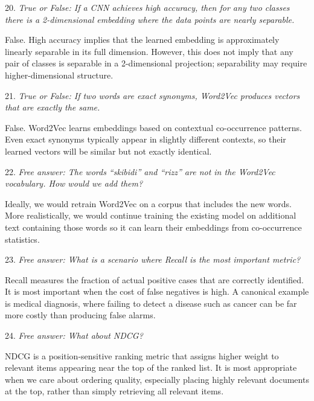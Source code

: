 \vspace{1cm}

20. \textit{True or False: If a CNN achieves high accuracy, then for any two classes there is a 2-dimensional embedding where the data points are nearly separable.}

False. High accuracy implies that the learned embedding is approximately linearly separable in its full dimension. However, this does not imply that any pair of classes is separable in a 2-dimensional projection; separability may require higher-dimensional structure.

\vspace{1cm}

21. \textit{True or False: If two words are exact synonyms, Word2Vec produces vectors that are exactly the same.}

False. Word2Vec learns embeddings based on contextual co-occurrence patterns. Even exact synonyms typically appear in slightly different contexts, so their learned vectors will be similar but not exactly identical.

\vspace{1cm}

22. \textit{Free answer: The words ``skibidi'' and ``rizz'' are not in the Word2Vec vocabulary. How would we add them?}

Ideally, we would retrain Word2Vec on a corpus that includes the new words. More realistically, we would continue training the existing model on additional text containing those words so it can learn their embeddings from co-occurrence statistics.

\vspace{1cm}

23. \textit{Free answer: What is a scenario where Recall is the most important metric?}

Recall measures the fraction of actual positive cases that are correctly identified. It is most important when the cost of false negatives is high. A canonical example is medical diagnosis, where failing to detect a disease such as cancer can be far more costly than producing false alarms.

\vspace{1cm}

24. \textit{Free answer: What about NDCG?}

NDCG is a position-sensitive ranking metric that assigns higher weight to relevant items appearing near the top of the ranked list. It is most appropriate when we care about ordering quality, especially placing highly relevant documents at the top, rather than simply retrieving all relevant items.

